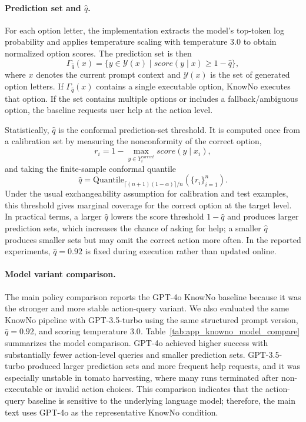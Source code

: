 \paragraph{Prediction set and $\hat{q}$.}
For each option letter, the implementation extracts the model's top-token log probability and applies temperature scaling with temperature $3.0$ to obtain normalized option scores. The prediction set is then
\[
\Gamma_{\hat{q}}(x)=\{y \in \mathcal{Y}(x) \mid score(y \mid x) \ge 1-\hat{q}\},
\]
where $x$ denotes the current prompt context and $\mathcal{Y}(x)$ is the set of generated option letters. If $\Gamma_{\hat{q}}(x)$ contains a single executable option, KnowNo executes that option. If the set contains multiple options or includes a fallback/ambiguous option, the baseline requests user help at the action level.

Statistically, $\hat{q}$ is the conformal prediction-set threshold. It is computed once from a calibration set by measuring the nonconformity of the correct option,
\[
r_i = 1 - \max_{y \in Y_i^{correct}} score(y \mid x_i),
\]
and taking the finite-sample conformal quantile
\[
\hat{q} = \mathrm{Quantile}_{\lceil (n+1)(1-\alpha) \rceil/n}\left(\{r_i\}_{i=1}^{n}\right).
\]
Under the usual exchangeability assumption for calibration and test examples, this threshold gives marginal coverage for the correct option at the target level. In practical terms, a larger $\hat{q}$ lowers the score threshold $1-\hat{q}$ and produces larger prediction sets, which increases the chance of asking for help; a smaller $\hat{q}$ produces smaller sets but may omit the correct action more often. In the reported experiments, $\hat{q}=0.92$ is fixed during execution rather than updated online.

\paragraph{Model variant comparison.}
The main policy comparison reports the GPT-4o KnowNo baseline because it was the stronger and more stable action-query variant. We also evaluated the same KnowNo pipeline with GPT-3.5-turbo using the same structured prompt version, $\hat{q}=0.92$, and scoring temperature $3.0$. Table~\ref{tab:app_knowno_model_compare} summarizes the model comparison. GPT-4o achieved higher success with substantially fewer action-level queries and smaller prediction sets. GPT-3.5-turbo produced larger prediction sets and more frequent help requests, and it was especially unstable in tomato harvesting, where many runs terminated after non-executable or invalid action choices. This comparison indicates that the action-query baseline is sensitive to the underlying language model; therefore, the main text uses GPT-4o as the representative KnowNo condition.

